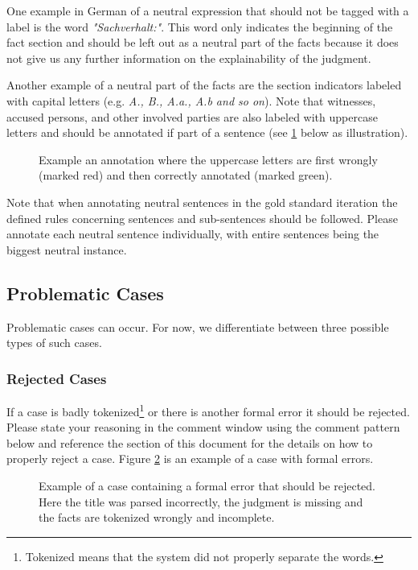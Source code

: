 \documentclass{article}
\begin{document}
One example in German of a neutral expression that should not be tagged with a label is the word \emph{"Sachverhalt:"}. This word only indicates the beginning of the fact section and should be left out as a neutral part of the facts because it does not give us any further information on the explainability of the judgment. 

Another example of a neutral part of the facts are the section indicators labeled with capital letters (e.g. \emph{A., B., A.a., A.b and so on}). Note that witnesses, accused persons, and other involved parties are also labeled with uppercase letters and should be annotated if part of a sentence (see \ref{uppercase} below as illustration).
\begin{figure}[H]
     \caption{Example an annotation where the uppercase letters are first wrongly (marked red)  and then correctly annotated (marked green). }
     \label{uppercase}
\end{figure}

Note that when annotating neutral sentences in the gold standard iteration the defined rules concerning sentences and sub-sentences should be followed. Please annotate each neutral sentence individually, with entire sentences being the biggest neutral instance.

\subsection{Problematic Cases}
Problematic cases can occur. For now, we differentiate between three possible types of such cases.

\subsubsection{Rejected Cases}
If a case is badly tokenized\footnote{Tokenized means that the system did not properly separate the words.} or there is another formal error it should be rejected. Please state your reasoning in the comment window using the comment pattern below and reference the  section of this document for the details on how to properly reject a case. Figure \ref{reject_case} is an example of a case with formal errors. 
\begin{figure}[H]
     \caption{Example of a case containing a formal error that should be rejected. Here the title was parsed incorrectly, the judgment is missing and the facts are tokenized wrongly and incomplete.}
     \label{reject_case}
\end{figure}
\end{document}
